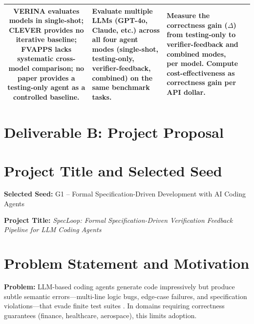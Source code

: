 \documentclass[11pt,a4paper]{article}
\begin{document}
\begin{table}[H]
\begin{tabularx}{\textwidth}{|c|X|X|X|}
VERINA \cite{verina2026} evaluates models in single-shot; CLEVER \cite{clever2025} provides no iterative baseline; FVAPPS \cite{fvapps2025} lacks systematic cross-model comparison; no paper provides a testing-only agent as a controlled baseline. &
Evaluate multiple LLMs (GPT-4o, Claude, etc.) across all four agent modes (single-shot, testing-only, verifier-feedback, combined) on the same benchmark tasks. &
Measure the correctness gain ($\Delta$) from testing-only to verifier-feedback and combined modes, per model. Compute cost-effectiveness as correctness gain per API dollar. \\
\hline
\end{tabularx}
\end{table}


\newpage
\section*{Deliverable B: Project Proposal}

\section{Project Title and Selected Seed}

\textbf{Selected Seed:} G1 -- Formal Specification-Driven Development with AI Coding Agents

\textbf{Project Title:} \textit{SpecLoop: Formal Specification-Driven Verification Feedback Pipeline for LLM Coding Agents}

\section{Problem Statement and Motivation}

\textbf{Problem:} LLM-based coding agents generate code impressively but produce subtle semantic errors---multi-line logic bugs, edge-case failures, and specification violations---that evade finite test suites \cite{codeerrors2025}. In domains requiring correctness guarantees (finance, healthcare, aerospace), this limits adoption.
\end{document}
